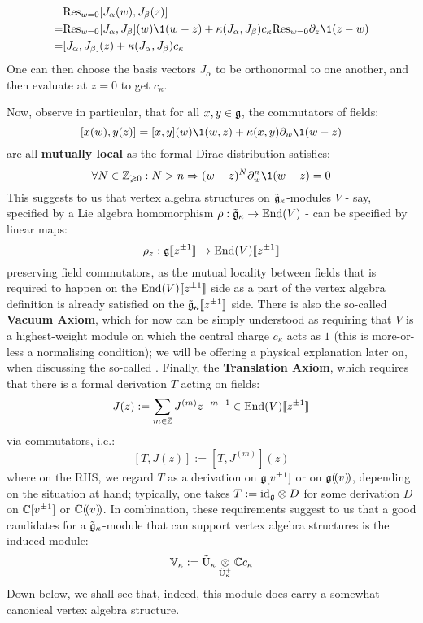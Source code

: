             $$
                \begin{aligned}
                    & \Res_{w = 0} [J_{\alpha}(w), J_{\beta}(z)]
                    \\
                    = & \Res_{w = 0} [J_{\alpha}, J_{\beta}](w) \1(w - z) + \kappa(J_{\alpha}, J_{\beta}) c_{\kappa} \Res_{w = 0} \del_z \1(z - w)
                    \\
                    = & [J_{\alpha}, J_{\beta}](z) + \kappa(J_{\alpha}, J_{\beta}) c_{\kappa} 
                \end{aligned}
            $$
        One can then choose the basis vectors $J_{\alpha}$ to be orthonormal to one another, and then evaluate at $z = 0$ to get $c_{\kappa}$. 

        Now, observe in particular, that for all $x, y \in \mathfrak{g}$, the commutators of fields:
            $$[x(w), y(z)] = [x, y](w) \1(w, z) + \kappa(x, y) \del_w \1(w - z)$$
        are all \textbf{mutually local} as the formal Dirac distribution satisfies:
            $$\forall N \in \Z_{\geq 0}: N > n \implies (w - z)^N \del_w^n \1(w - z) = 0$$
        This suggests to us that vertex algebra structures on $\tilde{\mathfrak{g}}_{\kappa}$-modules $V$ - say, specified by a Lie algebra homomorphism $\rho: \tilde{\mathfrak{g}}_{\kappa} \to \mathrm{End}(V)$ - can be specified by linear maps:
            $$\rho_z: \mathfrak{g}[\![z^{\pm 1}]\!] \to \mathrm{End}(V)[\![z^{\pm 1}]\!]$$
        preserving field commutators, as the mutual locality between fields that is required to happen on the $\mathrm{End}(V)[\![z^{\pm 1}]\!]$ side as a part of the vertex algebra definition is already satisfied on the $\tilde{\mathfrak{g}}_{\kappa}[\![z^{\pm 1}]\!]$ side. There is also the so-called \textbf{Vacuum Axiom}, which for now can be simply understood as requiring that $V$ is a highest-weight module on which the central charge $c_{\kappa}$ acts as $1$ (this is more-or-less a normalising condition); we will be offering a physical explanation later on, when discussing the so-called . Finally, the \textbf{Translation Axiom}, which requires that there is a formal derivation $T$ acting on fields:
            $$J(z) := \sum_{m \in \mathbb{Z}} J^{(m)} z^{-m - 1} \in \mathrm{End}(V)[\![z^{\pm 1}]\!]$$
        via commutators, i.e.:
            $$[T, J(z)] := [T, J^{(m)}](z)$$
        where on the RHS, we regard $T$ as a derivation on $\mathfrak{g}[v^{\pm 1}]$ or on $\mathfrak{g}(\!(v)\!)$, depending on the situation at hand; typically, one takes $T := \id_{\g} \tensor D$ for some derivation $D$ on $\mathbb{C}[v^{\pm 1}]$ or $\mathbb{C}(\!(v)\!)$. In combination, these requirements suggest to us that a good candidates for a $\tilde{\mathfrak{g}}_{\kappa}$-module that can support vertex algebra structures is the induced module:
            $$\V_{\kappa} := \tilde{\rmU}_{\kappa} \tensor_{\tilde{\rmU}_{\kappa}^+} \bbC c_{\kappa}$$
        Down below, we shall see that, indeed, this module does carry a somewhat canonical vertex algebra structure.

